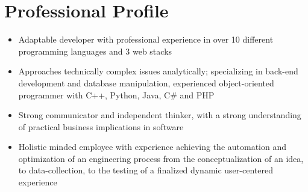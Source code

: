 \documentclass[letterpaper]{deedy-resume} %
\begin{document}
\section{Professional Profile}
\begin{itemize}

   
    \item Adaptable developer with professional experience in over 10 different programming languages and 3 web stacks
    \vspace{-5pt}
    \item Approaches technically complex issues analytically; specializing in back-end development and database manipulation, \newline 
    experienced object-oriented programmer with C++,  Python, Java, C\# and PHP 
    \vspace{-5pt}
    \item Strong communicator and independent thinker, 
    with a strong understanding of practical business implications in software 
    \vspace{-5pt}
    \item Holistic minded employee with experience achieving the automation and optimization of an engineering process from the \newline conceptualization of an idea, to data-collection,  to the testing of a finalized  dynamic user-centered experience
    \vspace{-5pt}


    
    
    
    

 
    
    
    
\end{itemize}
\end{document}
